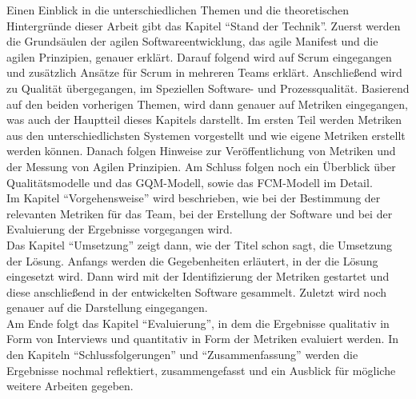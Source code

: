 Einen Einblick in die unterschiedlichen Themen und die theoretischen Hintergründe dieser Arbeit gibt das Kapitel ``Stand der Technik''.
Zuerst werden die Grundsäulen der agilen Softwareentwicklung, das agile Manifest und die agilen Prinzipien, genauer erklärt.
Darauf folgend wird auf Scrum eingegangen und zusätzlich Ansätze für Scrum in mehreren Teams erklärt.
Anschließend wird zu Qualität übergegangen, im Speziellen Software- und Prozessqualität.
Basierend auf den beiden vorherigen Themen, wird dann genauer auf Metriken eingegangen, was auch der Hauptteil dieses Kapitels darstellt.
Im ersten Teil werden Metriken aus den unterschiedlichsten Systemen vorgestellt und wie eigene Metriken erstellt werden können.
Danach folgen Hinweise zur Veröffentlichung von Metriken und der Messung von Agilen Prinzipien.
Am Schluss folgen noch ein Überblick über Qualitätsmodelle und das \ac{GQM}-Modell, sowie das \ac{FCM}-Modell im Detail.
\\
Im Kapitel ``Vorgehensweise'' wird beschrieben, wie bei der Bestimmung der relevanten Metriken für das Team, bei der Erstellung der Software und bei der Evaluierung der Ergebnisse vorgegangen wird.
\\
Das Kapitel ``Umsetzung'' zeigt dann, wie der Titel schon sagt, die Umsetzung der Lösung.
Anfangs werden die Gegebenheiten erläutert, in der die Lösung eingesetzt wird.
Dann wird mit der Identifizierung der Metriken gestartet und diese anschließend in der entwickelten Software gesammelt.
Zuletzt wird noch genauer auf die Darstellung eingegangen.
\\
Am Ende folgt das Kapitel ``Evaluierung'', in dem die Ergebnisse qualitativ in Form von Interviews und quantitativ in Form der Metriken evaluiert werden.
In den Kapiteln ``Schlussfolgerungen'' und ``Zusammenfassung'' werden die Ergebnisse nochmal reflektiert, zusammengefasst und ein Ausblick für mögliche weitere Arbeiten gegeben.
